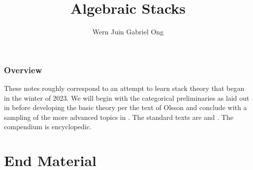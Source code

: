\documentclass{amsart}
\theoremstyle{definition}
\numberwithin{equation}{section}
\begin{document}
\large
\title[Algebraic Stacks]{Algebraic Stacks}
\author{Wern Juin Gabriel Ong}
\address{Bowdoin College, Brunswick, Maine 04011}
\maketitle
\section*{Overview}
These notes roughly correspond to an attempt to learn stack theory that began in the winter of 2023. We will begin with the categorical preliminaries as laid out in \cite{Vistoli} before developing the basic theory per the text of Olsson \cite{Olsson} and conclude with a sampling of the more advanced topics in \cite[Part 7]{stacks-project}. The standard texts are \cite{LaumonMoret-Bailly} and \cite{Olsson}. The compendium \cite{stacks-project} is encyclopedic. 
\tableofcontents
\newpage













\part*{End Material}
\appendix

\printbibliography
\end{document}
